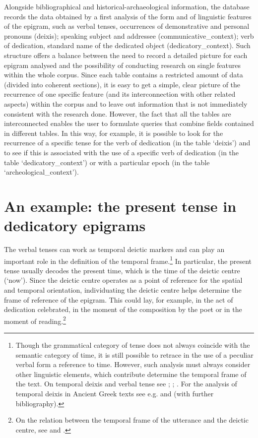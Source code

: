 \documentclass[amsthm,ebook]{saparticle}
\begin{document}
Alongside bibliographical and historical-archaeological information, the database records the data obtained by a first
analysis of the form and of linguistic features of the epigram, such as verbal tenses, occurrences of demonstrative and
personal pronouns (deixis); speaking subject and addressee (communicative\_context); verb of dedication, standard name
of the dedicated object (dedicatory\_context).
Such structure offers a balance between the need to record a detailed picture for each epigram analysed and the
possibility of conducting research on single features within the whole corpus. Since each table contains a restricted
amount of data (divided into coherent sections), it is easy to get a simple, clear picture of the recurrence of one
specific feature (and its interconnection with other related aspects) within the corpus and to leave out information
that is not immediately consistent with the research done. However, the fact that all the tables are interconnected enables the user to formulate queries that combine fields contained in different tables. In this way, for example, it is possible to look for the
recurrence of a specific tense for the verb of dedication (in the table `deixis') and to see if this is associated with
the use of a specific verb of dedication (in the table `dedicatory\_context') or with a particular epoch (in the table
`archeological\_context').




\section{An example: the present tense in dedicatory epigrams}


\noindent The verbal tenses can work as temporal deictic markers and can play an important role in the definition of the temporal
frame.\footnote{ Though the grammatical category of tense does not always coincide with the semantic category of time,
it is still possible to retrace in the use of a peculiar verbal form a reference to time. However, such analysis must
always consider other linguistic elements, which contribute determine the temporal frame of the text. On temporal
deixis and verbal tense see \citet[677-690]{lyons_semantics_1977}; \citet[73-79]{levinson_pragmatics_1983}; \citet[14-26 and 120-130]{klein_time_1994}. For the
analysis of temporal deixis in Ancient Greek texts see e.g. \citet{dalessio_past_2004} and \citet[8f.]{edmunds_deixis_2008} (with further
bibliography).} In particular, the present tense usually decodes the present time, which is the time of the deictic
centre (`now'). Since the deictic centre operates as a point of reference for the spatial and temporal orientation,
individuating the deictic centre helps determine the frame of reference of the epigram. This could lay, for example, in
the act of dedication celebrated, in the moment of the composition by the poet or in the moment of reading.\footnote{
On the relation between the temporal frame of the utterance and the deictic centre, see \citet[79f.]{levinson_pragmatics_1983} and
\citet{dalessio_past_2004}.} \ 
\end{document}
